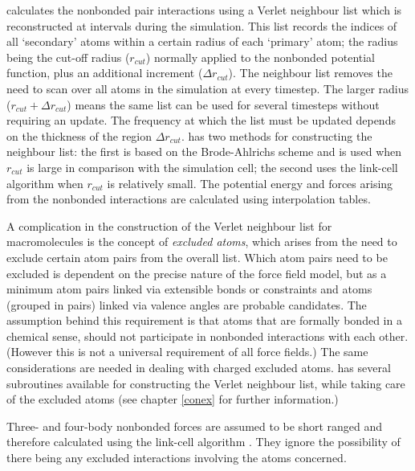 \D{} calculates the nonbonded pair interactions using a
Verlet neighbour list \cite{allen-89a} which is reconstructed at
intervals during the simulation. This list records the indices of all
`secondary' atoms within a certain radius of each `primary' atom; the
radius being the cut-off radius ($r_{cut}$) normally applied to the
nonbonded potential function, plus an additional increment ($\Delta
r_{cut}$). The neighbour list removes the need to scan over all atoms
in the simulation at every timestep.  The larger radius
($r_{cut}+\Delta r_{cut}$) means the same list can be used for several
timesteps without requiring an update. The frequency at which the list
must be updated depends on the thickness of the region $\Delta
r_{cut}$. \D{} has two methods for constructing the neighbour
list: the first is based on the Brode-Ahlrichs scheme
\cite{brode-86a} and is used when $r_{cut}$ is large in comparison with
the simulation cell; the second uses the link-cell algorithm
\cite{hockney-81a} when $r_{cut}$ is relatively small. The potential
energy and forces arising from the nonbonded interactions are
calculated using interpolation tables.

A complication in the construction of the Verlet
neighbour list for macromolecules is the concept of {\em excluded atoms},
which arises from the need to exclude certain atom pairs from the overall
list.  Which atom pairs need to be excluded is dependent on the precise nature
of the force field model, but as a minimum atom pairs
linked via extensible bonds or
constraints and atoms (grouped in pairs) linked via
valence angles are probable candidates. The
assumption behind this requirement is that atoms that are formally
bonded in a chemical sense, should not participate in
nonbonded interactions with each other.  (However
this is not a universal requirement of all force fields.)
The same considerations are needed in dealing with charged excluded atoms. \D{}
has several subroutines available for constructing the
Verlet neighbour list, while taking care of the
excluded atoms (see chapter \ref{conex} for further information.)

Three- and
four-body
nonbonded forces are assumed to be short
ranged and therefore calculated using the link-cell algorithm
\cite{hockney-81a}. They ignore the possibility of there being any
excluded interactions involving the atoms concerned. 

